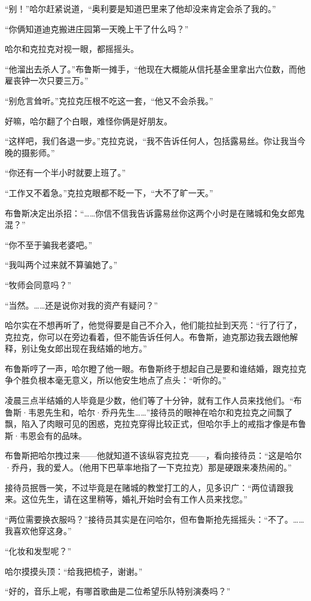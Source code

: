 \documentclass[../main]{subfiles}
\begin{document}
“别！”哈尔赶紧说道，“奥利要是知道巴里来了他却没来肯定会杀了我的。”

“你俩知道迪克搬进庄园第一天晚上干了什么吗？”

哈尔和克拉克对视一眼，都摇摇头。

“他溜出去杀人了。”布鲁斯一摊手，“他现在大概能从信托基金里拿出六位数，而他雇丧钟一次只要三万。”

“别危言耸听。”克拉克压根不吃这一套，“他又不会杀我。”

好嘛，哈尔翻了个白眼，难怪你俩是好朋友。

“这样吧，我们各退一步。”克拉克说，“我不告诉任何人，包括露易丝。你让我当今晚的摄影师。”

“你还有一个半小时就要上班了。”

“工作又不着急。”克拉克眼都不眨一下，“大不了旷一天。”

布鲁斯决定出杀招：“……你信不信我告诉露易丝你这两个小时是在赌城和兔女郎鬼混？”

“你不至于骗我老婆吧。”

“我叫两个过来就不算骗她了。”

“牧师会同意吗？”

“当然。……还是说你对我的资产有疑问？”

哈尔实在不想再听了，他觉得要是自己不介入，他们能拉扯到天亮：“行了行了，克拉克，你可以在旁边看着，但不能告诉任何人。布鲁斯，迪克那边我去跟他解释，别让兔女郎出现在我结婚的地方。”

布鲁斯哼了一声，哈尔瞪了他一眼。布鲁斯终于想起自己是要和谁结婚，跟克拉克争个胜负根本毫无意义，所以他安生地点了点头：“听你的。”

凌晨三点半结婚的人毕竟是少数，他们等了十分钟，就有工作人员来找他们。“布鲁斯·韦恩先生和，哈尔·乔丹先生……”接待员的眼神在哈尔和克拉克之间飘了飘，陷入了肉眼可见的困惑，克拉克穿得比较正式，但哈尔手上的戒指才像是布鲁斯·韦恩会有的品味。

布鲁斯把哈尔拽过来——他就知道不该纵容克拉克——，看向接待员：“这是哈尔·乔丹，我的爱人。（他用下巴草率地指了一下克拉克）那是硬跟来凑热闹的。”

接待员抿唇一笑，不过毕竟是在赌城的教堂打工的人，见多识广：“两位请跟我来。这位先生，请在这里稍等，婚礼开始时会有工作人员来找您。”

“两位需要换衣服吗？”接待员其实是在问哈尔，但布鲁斯抢先摇摇头：“不了。……我喜欢他穿这身。”

“化妆和发型呢？”

哈尔摸摸头顶：“给我把梳子，谢谢。”

“好的，音乐上呢，有哪首歌曲是二位希望乐队特别演奏吗？”
\end{document}
